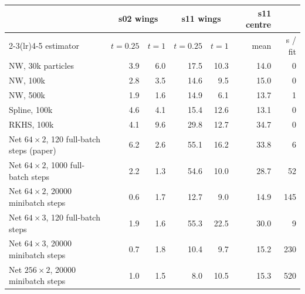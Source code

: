 \begin{tabular}{l rr rr r r}
\toprule
 & \multicolumn{2}{c}{s02 wings} & \multicolumn{2}{c}{s11 wings} & s11 centre\\
\cmidrule(lr){2-3}\cmidrule(lr){4-5}
estimator & $t=0.25$ & $t=1$ & $t=0.25$ & $t=1$ & mean & s / fit\\
\midrule
NW, 30k particles & 3.9 & 6.0 & 17.5 & 10.3 & 14.0 & 0\\
NW, 100k & 2.8 & 3.5 & 14.6 & 9.5 & 15.0 & 0\\
NW, 500k & 1.9 & 1.6 & 14.9 & 6.1 & 13.7 & 1\\
Spline, 100k & 4.6 & 4.1 & 15.4 & 12.6 & 13.1 & 0\\
RKHS, 100k & 4.1 & 9.6 & 29.8 & 12.7 & 34.7 & 0\\
Net $64\times2$, 120 full-batch steps (paper) & 6.2 & 2.6 & 55.1 & 16.2 & 33.8 & 6\\
Net $64\times2$, 1000 full-batch steps & 2.2 & 1.3 & 54.6 & 10.0 & 28.7 & 52\\
Net $64\times2$, 20000 minibatch steps & 0.6 & 1.7 & 12.7 & 9.0 & 14.9 & 145\\
Net $64\times3$, 120 full-batch steps & 1.9 & 1.6 & 55.3 & 22.5 & 30.0 & 9\\
Net $64\times3$, 20000 minibatch steps & 0.7 & 1.8 & 10.4 & 9.7 & 15.2 & 230\\
Net $256\times2$, 20000 minibatch steps & 1.0 & 1.5 & 8.0 & 10.5 & 15.3 & 520\\
\bottomrule
\end{tabular}
